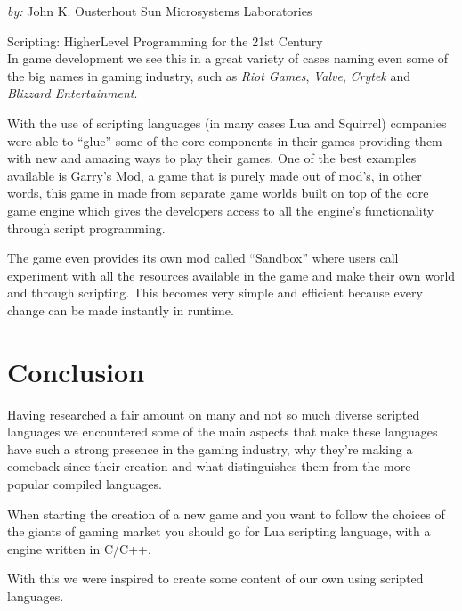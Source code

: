 \documentclass[12pt]{article}
\begin{document}
\emph{by: }John K. Ousterhout Sun Microsystems Laboratories

Scripting: HigherLevel Programming for the 21st Century\\

In game development we see this in a great variety of cases naming even some of the big names in gaming industry, such as \textit{Riot Games}, \textit{Valve}, \textit{Crytek} and \textit{Blizzard Entertainment}.

With the use of scripting languages (in many cases Lua and Squirrel) companies were able to “glue” some of the core components in their games providing them with new and amazing ways to play their games. One of the best examples available is Garry’s Mod, a game that is purely made out of mod’s, in other words, this game in made from separate game worlds built on top of the core game engine which gives the developers access to all the engine’s functionality through script programming. 

The game even provides its own mod called “Sandbox” where users call experiment with all the resources available in the game and make their own world and through scripting. This becomes very simple and efficient because every change can be made instantly in runtime.

\section{Conclusion}
Having researched a fair amount on many and not so much diverse scripted languages we encountered some of the main aspects that make these languages have such a strong presence in the gaming industry, why they’re making a comeback since their creation and what distinguishes them from the more popular compiled languages.

When starting the creation of a new game and you want to follow the choices of the giants of gaming market you should go for Lua scripting language, with a engine written in C/C++.

With this we were inspired to create some content of our own using scripted languages.
\end{document}

